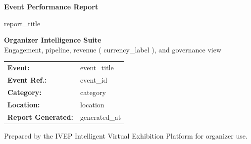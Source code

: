 \documentclass[a4paper,12pt]{article}
\begin{document}
\begin{titlepage}
    \centering
    \vspace*{2cm}
    {\Huge \color{primary} \bfseries Event Performance Report \par}
    \vspace{1cm}
    {\Large \color{secondary} {{ report_title }} \par}
    \vspace{2cm}
    \begin{tcolorbox}[colback=primary, colframe=primary, fontupper=\color{white}, center, width=0.85\textwidth, arc=5pt]
        \centering
        \vspace{0.5cm}
        \textbf{\large Organizer Intelligence Suite} \\
        Engagement, pipeline, revenue ({{ currency_label }}), and governance view
        \vspace{0.5cm}
    \end{tcolorbox}
    \vfill
    \begin{tabularx}{0.85\textwidth}{l X}
        \textbf{Event:} & {{ event_title }} \\
        \textbf{Event Ref.:} & {{ event_id }} \\
        \textbf{Category:} & {{ category }} \\
        \textbf{Location:} & {{ location }} \\
        \textbf{Report Generated:} & {{ generated_at }} \\
    \end{tabularx}
    \vspace{1cm}
    {\small \color{gray} Prepared by the IVEP Intelligent Virtual Exhibition Platform for organizer use. \par}
\end{titlepage}

\newpage
\tableofcontents
\newpage
\end{document}
